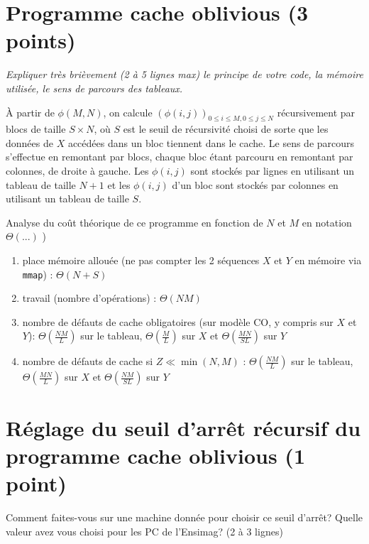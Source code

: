 \documentclass[10pt,a4paper]{article}
\begin{document}
\section{Programme cache oblivious  (3 points)}
{\em Expliquer très brièvement (2 à 5 lignes max) le principe de votre code, la mémoire utilisée, le sens de parcours des tableaux.}

\medskip

À partir de $\phi(M,N)$, on calcule $\left( \phi(i,j) \right)_{0 \leqslant i \leqslant M, 0 \leqslant j \leqslant N}$ récursivement par blocs de taille $S \times N$, où $S$ est le seuil de récursivité choisi de sorte que les données de $X$ accédées dans un bloc tiennent dans le cache. Le sens de parcours s'effectue en remontant par blocs, chaque bloc étant parcouru en remontant par colonnes, de droite à gauche. Les $\phi(i,j)$ sont stockés par lignes en utilisant un tableau de taille $N+1$ et les $\phi(i,j)$ d'un bloc sont stockés par colonnes en utilisant un tableau de taille $S$.

\medskip

Analyse du coût théorique de ce  programme en fonction de $N$ et $M$  en notation $\Theta(...)$ )
\begin{enumerate}
  \item place mémoire allouée (ne pas compter les 2 séquences $X$ et $Y$ en mémoire via {\tt mmap}) : $\Theta(N + S)$
  \item travail (nombre d'opérations) : $\Theta(NM)$
  \item nombre de défauts de cache obligatoires (sur modèle CO, y compris sur $X$ et $Y$): $\Theta \left( \frac{NM}{L} \right)$ sur le tableau, $\Theta \left( \frac{M}{L} \right)$ sur $X$ et $\Theta \left( \frac{MN}{SL} \right)$ sur $Y$
  \item nombre de défauts de cache si $Z \ll \min(N,M)$ : $\Theta \left( \frac{NM}{L} \right)$ sur le tableau, $\Theta \left( \frac{MN}{L} \right)$ sur $X$ et $\Theta \left( \frac{NM}{SL} \right)$ sur $Y$
\end{enumerate}

\section{Réglage du seuil d'arrêt récursif du programme cache oblivious  (1 point)} 
Comment faites-vous sur une machine donnée pour choisir ce seuil d'arrêt? Quelle valeur avez vous choisi pour les
PC de l'Ensimag? (2 à 3 lignes)

\medskip
\end{document}
